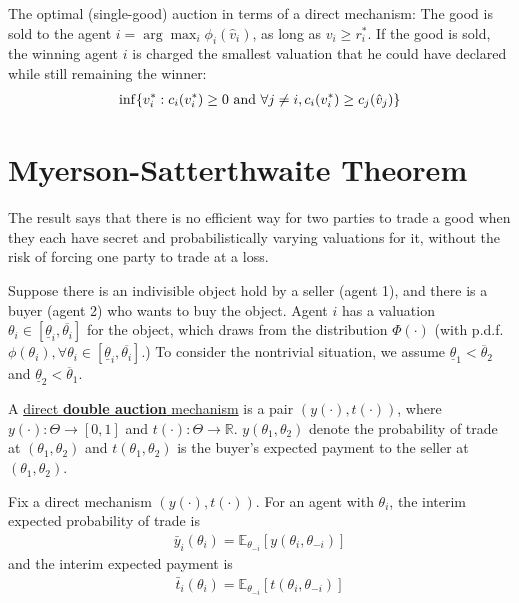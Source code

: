 \documentclass[11pt]{elegantbook}
\begin{document}
\begin{theorem}[Myerson (1981)]
    The optimal (single-good) auction in terms of a direct mechanism: The good is sold to the agent $i=\arg\max_i\phi_i(\hat{v}_i)$, as long as $v_i\geq r_i^*$. If the good is sold, the winning agent $i$ is charged the smallest valuation that he could have declared while still remaining the winner:
    \begin{equation}
        \begin{aligned}
            \inf\{v_i^*:c_i(v_i^*)\geq 0 \textnormal{ and }\forall j\neq i, c_i(v_i^*)\geq c_j(\hat{v}_j)\}
        \end{aligned}
        \nonumber
    \end{equation}
\end{theorem}



\section{Myerson-Satterthwaite Theorem}
The result says that there is no efficient way for two parties to trade a good when they each have secret and probabilistically varying valuations for it, without the risk of forcing one party to trade at a loss.

Suppose there is an indivisible object hold by a seller (agent 1), and there is a buyer (agent 2) who wants to buy the object. Agent $i$ has a valuation $\theta_i\in[\underline{\theta}_i,\overline{\theta_i}]$ for the object, which draws from the distribution $\Phi(\cdot)$ (with p.d.f. $\phi(\theta_i),\forall \theta_i\in [\underline{\theta}_i,\overline{\theta_i}]$.) To consider the nontrivial situation, we assume $\underline{\theta}_1<\overline{\theta}_2$ and $\underline{\theta}_2<\overline{\theta}_1$.


\begin{definition}
    \normalfont
    A \underline{direct \textbf{double auction} mechanism} is a pair $(y(\cdot),t(\cdot))$, where $y(\cdot):\Theta \rightarrow [0,1]$ and $t(\cdot): \Theta \rightarrow \mathbb{R}$. $y(\theta_1,\theta_2)$ denote the probability of trade at $(\theta_1,\theta_2)$ and $t(\theta_1,\theta_2)$ is the buyer's expected payment to the seller at $(\theta_1,\theta_2)$.
\end{definition}

Fix a direct mechanism $(y(\cdot),t(\cdot))$. For an agent with $\theta_i$, the interim expected probability of trade is
\begin{equation}
    \begin{aligned}
        \bar{y}_i(\theta_i)=\mathbb{E}_{\theta_{-i}}\left[y(\theta_i,\theta_{-i})\right]
    \end{aligned}
    \nonumber
\end{equation}
and the interim expected payment is
\begin{equation}
    \begin{aligned}
        \bar{t}_i(\theta_i)=\mathbb{E}_{\theta_{-i}}\left[t(\theta_i,\theta_{-i})\right]
    \end{aligned}
    \nonumber
\end{equation}
\end{document}

